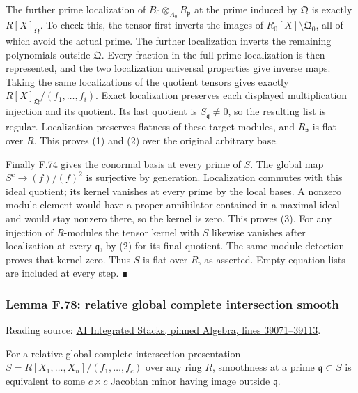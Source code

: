 \documentclass[11pt,a4paper,openany]{report}
\begin{document}
The further prime localization of \(B_0\otimes_{A_0}R_{\mathfrak p}\) at the prime induced by \(\mathfrak Q\) is exactly \(R[X]_{\mathfrak Q}\). To check this, the tensor first inverts the images of \(R_0[X]\setminus\mathfrak Q_0\), all of which avoid the actual prime. The further localization inverts the remaining polynomials outside \(\mathfrak Q\). Every fraction in the full prime localization is then represented, and the two localization universal properties give inverse maps. Taking the same localizations of the quotient tensors gives exactly \(R[X]_{\mathfrak Q}/(f_1,\ldots,f_i)\). Exact localization preserves each displayed multiplication injection and its quotient. Its last quotient is \(S_{\mathfrak q}\ne0\), so the resulting list is regular. Localization preserves flatness of these target modules, and \(R_{\mathfrak p}\) is flat over \(R\). This proves (1) and (2) over the original arbitrary base.

Finally \hyperref[AG-RG-S05-algebra-lemma-regular-quasi-regular]{F.74} gives the conormal basis at every prime of \(S\). The global map \(S^c\to(f)/(f)^2\) is surjective by generation. Localization commutes with this ideal quotient; its kernel vanishes at every prime by the local bases. A nonzero module element would have a proper annihilator contained in a maximal ideal and would stay nonzero there, so the kernel is zero. This proves (3). For any injection of \(R\)-modules the tensor kernel with \(S\) likewise vanishes after localization at every \(\mathfrak q\), by (2) for its final quotient. The same module detection proves that kernel zero. Thus \(S\) is flat over \(R\), as asserted. Empty equation lists are included at every step. ∎

\label{AG-RG-S05-algebra-lemma-relative-global-complete-intersection-smooth}

\subsubsection{Lemma F.78: relative global complete intersection smooth}\label{AG-RG-S05-lemma-f.78-relative-global-complete-intersection-smooth}

Reading source: \href{https://github.com/KokunoYumeto/unofficial-stacks-project-ai-drafts/blob/565b10e987aba5969b21145a0833f42d69f96790/algebra.tex\#L39071-L39113}{AI Integrated Stacks, pinned Algebra, lines 39071--39113}.

For a relative global complete-intersection presentation \(S=R[X_1,\ldots,X_n]/(f_1,\ldots,f_c)\) over any ring \(R\), smoothness at a prime \(\mathfrak q\subset S\) is equivalent to some \(c\times c\) Jacobian minor having image outside \(\mathfrak q\).
\end{document}
